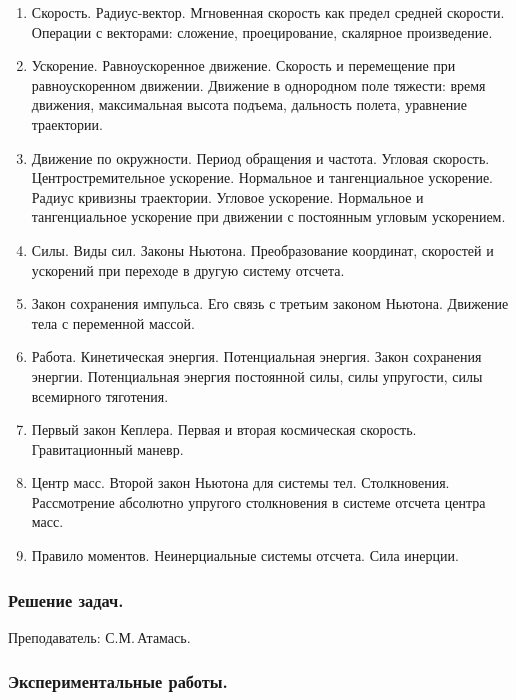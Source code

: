\documentclass[12pt,a4paper,oneside,draft]{scrartcl}
\newcounter{notask}
\begin{document}
\begin{enumerate}
\item Скорость. Радиус-вектор. Мгновенная скорость как предел средней 
скорости. Операции с векторами: сложение, проецирование, скалярное 
произведение.
\item Ускорение. Равноускоренное движение. Скорость и перемещение при 
равноускоренном движении. Движение в однородном поле тяжести: время 
движения, максимальная высота подъема, дальность полета, уравнение 
траектории.
\item Движение по окружности. Период обращения и частота. Угловая 
скорость. Центростремительное ускорение. Нормальное и тангенциальное 
ускорение. Радиус кривизны траектории. Угловое ускорение. Нормальное 
и тангенциальное ускорение при движении с постоянным угловым 
ускорением.
\item Силы. Виды сил. Законы Ньютона. Преобразование координат, 
скоростей и ускорений при переходе в другую систему отсчета. 
\item Закон сохранения импульса. Его связь с третьим законом Ньютона. 
Движение тела с переменной массой.
\item Работа. Кинетическая энергия. Потенциальная энергия. Закон 
сохранения энергии. Потенциальная энергия постоянной силы, силы 
упругости, силы всемирного тяготения.
\item Первый закон Кеплера. Первая и вторая космическая скорость. 
Гравитационный маневр.
\item Центр масс. Второй закон Ньютона для системы тел. Столкновения. 
Рассмотрение абсолютно упругого столкновения в системе отсчета центра 
масс.
\item Правило моментов. Неинерциальные системы отсчета. Сила инерции.
\end{enumerate}

\subsubsection{Решение задач.}
\label{sec:daily_9_problems}

\textsf{Преподаватель: С.М.\,Атамась.}
\smallskip
\parindent=0mm








\setcounter{notask}{1}
\parindent=5mm

\subsubsection{Экспериментальные работы.}
\label{sec:daily_9_exp}
\end{document}
